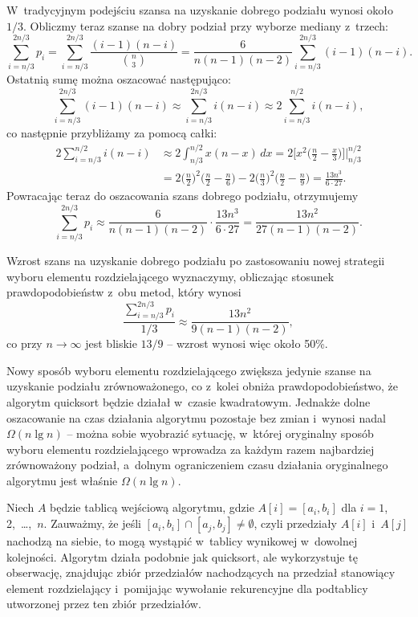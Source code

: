 \subproblem %
W~tradycyjnym podejściu szansa na uzyskanie dobrego podziału wynosi około $1/3$. Obliczmy teraz szanse na dobry podział przy wyborze mediany z~trzech:
\[
	\sum_{i=n/3}^{2n/3}p_i = \sum_{i=n/3}^{2n/3}\frac{(i-1)(n-i)}{\binom{n}{3}} = \frac{6}{n(n-1)(n-2)}\sum_{i=n/3}^{2n/3}(i-1)(n-i).
\]
Ostatnią sumę można oszacować następująco:
\[
	\sum_{i=n/3}^{2n/3}(i-1)(n-i) \approx \sum_{i=n/3}^{2n/3}i(n-i) \approx 2\sum_{i=n/3}^{n/2}i(n-i),
\]
co następnie przybliżamy za pomocą całki:
\begin{align*}
	2\sum_{i=n/3}^{n/2}i(n-i) &\approx 2\int_{n/3}^{n/2}x(n-x)\,dx = 2\biggl[x^2\biggl(\frac{n}{2}-\frac{x}{3}\biggr)\biggr]\bigg|_{n/3}^{n/2} \\
	&= 2\biggl(\frac{n}{2}\biggr)^2\biggl(\frac{n}{2}-\frac{n}{6}\biggr)-2\biggl(\frac{n}{3}\biggr)^2\biggl(\frac{n}{2}-\frac{n}{9}\biggr) = \frac{13n^3}{6\cdot27}.
\end{align*}
Powracając teraz do oszacowania szans dobrego podziału, otrzymujemy
\[
	\sum_{i=n/3}^{2n/3}p_i \approx \frac{6}{n(n-1)(n-2)}\cdot\frac{13n^3}{6\cdot27} = \frac{13n^2}{27(n-1)(n-2)}.
\]

Wzrost szans na uzyskanie dobrego podziału po zastosowaniu nowej strategii wyboru elementu rozdzielającego wyznaczymy, obliczając stosunek prawdopodobieństw z~obu metod, który wynosi
\[
	\frac{\sum_{i=n/3}^{2n/3}p_i}{1/3} \approx \frac{13n^2}{9(n-1)(n-2)},
\]
co przy $n\to\infty$ jest bliskie $13/9$ -- wzrost wynosi więc około 50\%.

\subproblem %
Nowy sposób wyboru elementu rozdzielającego zwiększa jedynie szanse na uzyskanie podziału zrównoważonego, co z~kolei obniża prawdopodobieństwo, że algorytm quicksort będzie działał w~czasie kwadratowym. Jednakże dolne oszacowanie na czas działania algorytmu pozostaje bez zmian i~wynosi nadal $\Omega(n\lg n)$ -- można sobie wyobrazić sytuację, w~której oryginalny sposób wyboru elementu rozdzielającego wprowadza za każdym razem najbardziej zrównoważony podział, a~dolnym ograniczeniem czasu działania oryginalnego algorytmu jest właśnie $\Omega(n\lg n)$.


\subproblem %
Niech $A$ będzie tablicą wejściową algorytmu, gdzie $A[i]=[a_i,b_i]$ dla $i=1$, 2,~\dots,~$n$. Zauważmy, że jeśli $[a_i,b_i]\cap[a_j,b_j]\ne\emptyset$, czyli przedziały $A[i]$ i~$A[j]$ nachodzą na siebie, to mogą wystąpić w~tablicy wynikowej w~dowolnej kolejności. Algorytm działa podobnie jak quicksort, ale wykorzystuje tę obserwację, znajdując zbiór przedziałów nachodzących na przedział stanowiący element rozdzielający i~pomijając wywołanie rekurencyjne dla podtablicy utworzonej przez ten zbiór przedziałów.

